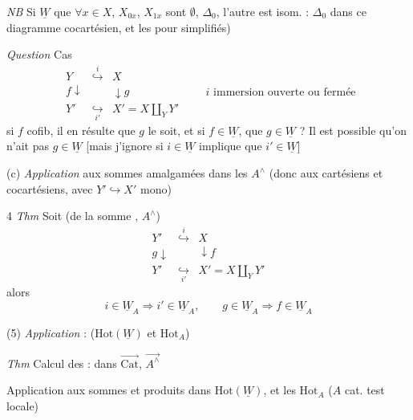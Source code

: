 \documentclass[11pt,a4paper]{article}
\begin{document}
\emph{NB} Si \ill{} $\underline{W}$ \ill{} que $\forall x \in X$,  \ill{} $X_{0x}$, $X_{1x}$ sont $\emptyset$, $\Delta_0$, l'autre est isom. : $\Delta_0$ \ill{} dans ce diagramme \ill{} cocartésien, et les \ill{} pour \ill{} simplifiés)

\emph{Question} Cas
\[
  \begin{array}{ccc}
    Y & \overset{i}{\hookrightarrow} & X \\
    {\scriptstyle f}\downarrow & & \downarrow{\scriptstyle g} \\
    Y' & \underset{i'}{\hookrightarrow} & X' = X \amalg_Y Y'
  \end{array}
  \qquad i \text{ immersion ouverte ou fermée}
\]
 si $f$ cofib, il en résulte que $g$ le soit, et si $f \in \underline{W}$, que $g \in \underline{W}$ ? Il est possible qu'on n'ait pas $g \in \underline{W}$ [mais j'ignore si $i \in \underline{W}$ implique que $i' \in \underline{W}$]

(c)  \emph{Application} aux sommes amalgamées dans les $A^{\wedge}$ (donc aux cartésiens et cocartésiens, avec $Y' \hookrightarrow X'$ mono)

4 \emph{Thm} Soit (de la somme ,  $A^{\wedge}$)
\[
  \begin{array}{ccc}
    Y' & \overset{i}{\hookrightarrow} & X \\
    {\scriptstyle g}\downarrow & & \downarrow{\scriptstyle f} \\
    Y' & \underset{i'}{\hookrightarrow} & X' = X \amalg_Y Y'
  \end{array}
\]
alors 
\[
  i \in \underline{W}_A \Longrightarrow i' \in \underline{W}_A, \qquad
  g \in \underline{W}_A \Longrightarrow f \in \underline{W}_A
\]

(5) \emph{Application} : ($\mathrm{Hot}(\underline{W})$ et $\mathrm{Hot}_A$)

\emph{Thm} Calcul des  : \ill{} dans $\overrightarrow{\mathrm{Cat}}$, $\overrightarrow{A^{\wedge}}$

Application aux sommes et produits dans $\mathrm{Hot}(\underline{W})$, et les $\mathrm{Hot}_A$ ($A$ cat. test locale)
\end{document}
